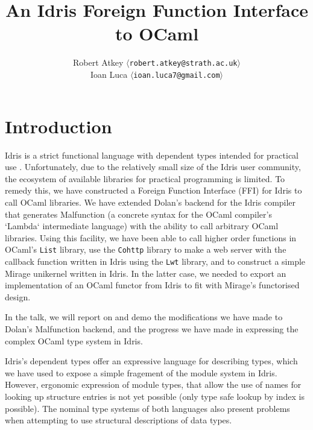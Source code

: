 \documentclass[a4paper,11pt,twocolumn]{article}
\title{An Idris Foreign Function Interface to OCaml}
\author{Robert Atkey  $\langle$\texttt{robert.atkey@strath.ac.uk}$\rangle$ \\
  Ioan Luca $\langle$\texttt{ioan.luca7@gmail.com}$\rangle$}
\date{}
\begin{document}
\maketitle

\section{Introduction}

Idris is a strict functional language with dependent types intended
for practical use \cite{idrisbook}. Unfortunately, due to the
relatively small size of the Idris user community, the ecosystem of
available libraries for practical programming is limited. To remedy
this, we have constructed a Foreign Function Interface (FFI) for Idris
to call OCaml libraries. We have extended Dolan's backend
\cite{dolan2016malfunctional} for the Idris compiler that generates
Malfunction (a concrete syntax for the OCaml compiler's `Lambda`
intermediate language) with the ability to call arbitrary OCaml
libraries. Using this facility, we have been able to call higher order
functions in OCaml's \texttt{List} library, use the \texttt{Cohttp}
library to make a web server with the callback function written in
Idris using the \texttt{Lwt} library, and to construct a simple Mirage
unikernel written in Idris. In the latter case, we needed to export an
implementation of an OCaml functor from Idris to fit with Mirage's
functorised design.

In the talk, we will report on and demo the modifications we have made
to Dolan's Malfunction backend, and the progress we have made in
expressing the complex OCaml type system in Idris.

Idris's dependent types offer an expressive language for describing
types, which we have used to expose a simple fragement of the module
system in Idris.  However, ergonomic expression of module types, that
allow the use of names for looking up structure entries is not yet
possible (only type safe lookup by index is possible). The nominal
type systems of both languages also present problems when attempting
to use structural descriptions of data types.


\end{document}
